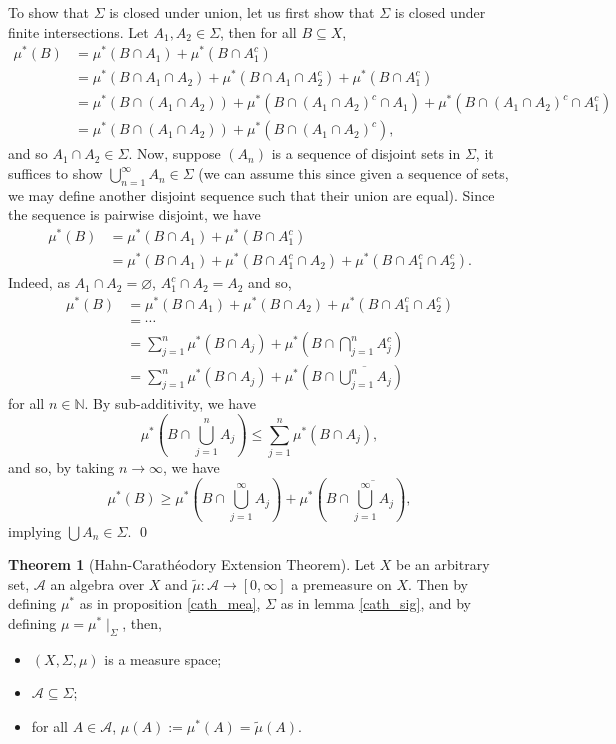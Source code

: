 \documentclass[
]{article}
\theoremstyle{definition}
\newtheorem{theorem}{Theorem}
\theoremstyle{definition}
\begin{document}
To show that \(\Sigma\) is closed under union, let us first show that
\(\Sigma\) is closed under finite intersections. Let
\(A_1, A_2 \in \Sigma\), then for all \(B \subseteq X\), \[\begin{split}
    \mu^*(B) & = \mu^*(B \cap A_1) + \mu^*(B \cap A_1^c)\\
      & = \mu^*(B \cap A_1 \cap A_2) + \mu^*(B \cap A_1 \cap A_2^c) + \mu^*(B \cap A_1^c)\\
      & = \mu^*(B \cap (A_1 \cap A_2)) + \mu^*(B \cap (A_1 \cap A_2)^c \cap A_1)
         + \mu^*(B \cap (A_1 \cap A_2)^c \cap A_1^c)\\
      & = \mu^*(B \cap (A_1 \cap A_2)) + \mu^*(B \cap (A_1 \cap A_2)^c),
  \end{split}\] and so \(A_1 \cap A_2 \in \Sigma\). Now, suppose
\((A_n)\) is a sequence of disjoint sets in \(\Sigma\), it suffices to
show \(\bigcup_{n = 1}^\infty A_n \in \Sigma\) (we can assume this since
given a sequence of sets, we may define another disjoint sequence such
that their union are equal). Since the sequence is pairwise disjoint, we
have \[\begin{split}
    \mu^*(B) & = \mu^*(B \cap A_1) + \mu^*(B \cap A_1^c)\\
      & = \mu^*(B \cap A_1) + \mu^*(B \cap A_1^c \cap A_2) + \mu^*(B \cap A_1^c \cap A_2^c).
  \end{split}\] Indeed, as \(A_1 \cap A_2 = \varnothing\),
\(A_1^c \cap A_2 = A_2\) and so, \[\begin{split}
    \mu^*(B) & = \mu^*(B \cap A_1) + \mu^*(B \cap A_2) + \mu^*(B \cap A_1^c \cap A_2^c)\\
      & = \cdots\\
      & = \sum_{j = 1}^n \mu^*(B \cap A_j) + \mu^*\left(B \cap \bigcap_{j = 1}^n A_j^c\right)\\
      & = \sum_{j = 1}^n \mu^*(B \cap A_j) + \mu^*\left(B \cap \overline{\bigcup_{j = 1}^n A_j}\right)
  \end{split}\] for all \(n \in \mathbb{N}\). By sub-additivity, we have
\[\mu^*\left(B \cap \bigcup_{j = 1}^n A_j\right) \le \sum_{j = 1}^n \mu^*(B \cap A_j),\]
and so, by taking \(n \to \infty\), we have
\[\mu^*(B) \ge \mu^*\left(B \cap \bigcup_{j = 1}^\infty A_j\right) + 
    \mu^*\left(B \cap \overline{\bigcup_{j = 1}^\infty A_j}\right),\]
implying \(\bigcup A_n \in \Sigma\). \qed

\begin{theorem}[Hahn-Carathéodory Extension Theorem]
  Let \(X\) be an arbitrary set, \(\mathcal{A}\) an algebra over \(X\) and 
  \(\tilde{\mu} : \mathcal{A} \to [0, \infty]\) a premeasure on \(X\). Then by 
  defining \(\mu^*\) as in proposition \ref{cath_mea}, \(\Sigma\) as in
  lemma \ref{cath_sig}, and by defining \(\mu = \mu^* \mid_\Sigma\), then,
  \begin{itemize}
    \item \((X, \Sigma, \mu)\) is a measure space;
    \item \(\mathcal{A} \subseteq \Sigma\);
    \item for all \(A \in \mathcal{A}\), \(\mu(A) := \mu^*(A) = \tilde{\mu}(A)\).
  \end{itemize}
\end{theorem}
\proof
\end{document}
